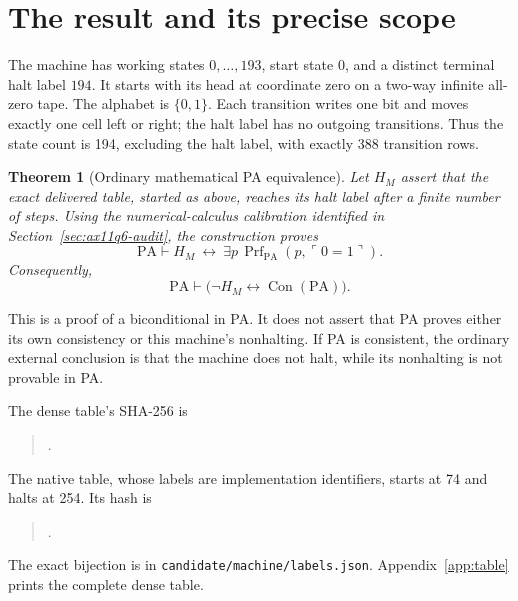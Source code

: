 \documentclass[10pt,letterpaper]{article}
\newcommand{\PA}{\mathrm{PA}}
\newcommand{\Con}{\operatorname{Con}}
\newcommand{\Prf}{\operatorname{Prf}}
\newcommand{\file}[1]{\texttt{\nolinkurl{#1}}}
\newtheorem{theorem}{Theorem}[section]
\begin{document}
\section{The result and its precise scope}

The machine has working states $0,\ldots,193$, start state
$0$, and a distinct terminal halt label $194$. It starts with its head at
coordinate zero on a two-way infinite all-zero tape. The alphabet is
$\{0,1\}$. Each transition writes one bit and moves exactly one cell left or
right; the halt label has no outgoing transitions. Thus the state count is
194, excluding the halt label, with exactly 388 transition rows.

\begin{theorem}[Ordinary mathematical PA equivalence]
Let $H_M$ assert that the exact delivered table, started as above,
reaches its halt label after a finite number of steps.
Using the numerical-calculus calibration identified in
Section~\ref{sec:ax11q6-audit}, the construction proves
\[
 \PA\vdash H_M\ \longleftrightarrow\
 \exists p\,\Prf_{\PA}(p,\ulcorner0=1\urcorner).
\]
Consequently,
\[
 \boxed{\ \PA\vdash\bigl(\neg H_M\longleftrightarrow\Con(\PA)\bigr).\ }
\]
\end{theorem}

This is a proof of a biconditional in PA. It does not assert that
PA proves either its own consistency or this machine's nonhalting. If PA
is consistent, the ordinary external conclusion is that the machine does
not halt, while its nonhalting is not provable in PA.

The dense table's SHA-256 is
\begin{quote}\small
{}.
\end{quote}
The native table, whose labels are implementation identifiers, starts at
74 and halts at 254. Its hash is
\begin{quote}\small
{}.
\end{quote}
The exact bijection is in \file{candidate/machine/labels.json}.
Appendix~\ref{app:table} prints the complete dense table.
\end{document}
